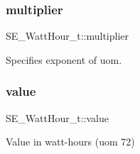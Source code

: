 \subsubsection{\texorpdfstring{multiplier}{multiplier}}
{\footnotesize\ttfamily S\+E\+\_\+\+Watt\+Hour\+\_\+t\+::multiplier}

Specifies exponent of uom. \mbox{\label{group__WattHour_gac2cce5b2817c07af0f2b8a8de573d845}} 
\subsubsection{\texorpdfstring{value}{value}}
{\footnotesize\ttfamily S\+E\+\_\+\+Watt\+Hour\+\_\+t\+::value}

Value in watt-\/hours (uom 72) 
